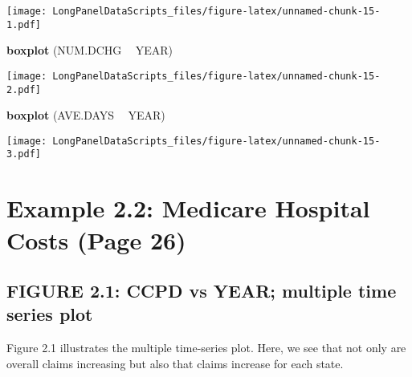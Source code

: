 \documentclass[]{book}
\newenvironment{Shaded}{\begin{snugshade}}{\end{snugshade}}
\newcommand{\KeywordTok}[1]{\textcolor[rgb]{0.13,0.29,0.53}{\textbf{#1}}}
\newcommand{\NormalTok}[1]{#1}
\newcommand{\OperatorTok}[1]{\textcolor[rgb]{0.81,0.36,0.00}{\textbf{#1}}}
\newcommand{\StringTok}[1]{\textcolor[rgb]{0.31,0.60,0.02}{#1}}
\begin{document}
\texttt{[image: LongPanelDataScripts\_files/figure-latex/unnamed-chunk-15-1.pdf]}

\begin{Shaded}
\begin{Highlighting}[]
\KeywordTok{boxplot}\NormalTok{ (NUM.DCHG }\OperatorTok{~}\StringTok{ }\NormalTok{YEAR)}
\end{Highlighting}
\end{Shaded}

\texttt{[image: LongPanelDataScripts\_files/figure-latex/unnamed-chunk-15-2.pdf]}

\begin{Shaded}
\begin{Highlighting}[]
\KeywordTok{boxplot}\NormalTok{ (AVE.DAYS }\OperatorTok{~}\StringTok{ }\NormalTok{YEAR)}
\end{Highlighting}
\end{Shaded}

\texttt{[image: LongPanelDataScripts\_files/figure-latex/unnamed-chunk-15-3.pdf]}

\hypertarget{example-2.2-medicare-hospital-costs-page-26}{%
\section{Example 2.2: Medicare Hospital Costs (Page 26)}\label{example-2.2-medicare-hospital-costs-page-26}}

\hypertarget{figure-2.1-ccpd-vs-year-multiple-time-series-plot}{%
\subsection{FIGURE 2.1: CCPD vs YEAR; multiple time series plot}\label{figure-2.1-ccpd-vs-year-multiple-time-series-plot}}

Figure 2.1 illustrates the multiple time-series plot. Here, we see that not only are overall claims increasing but also that claims increase for each state.
\end{document}
